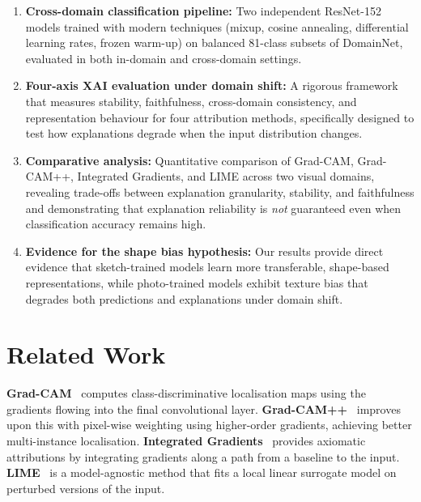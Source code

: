 \documentclass[12pt, a4paper]{article}
\begin{document}
\begin{enumerate}[leftmargin=*]
    \item \textbf{Cross-domain classification pipeline:} Two independent
          ResNet-152 models trained with modern techniques (mixup, cosine
          annealing, differential learning rates, frozen warm-up) on balanced
          81-class subsets of DomainNet, evaluated in both in-domain and
          cross-domain settings.
    \item \textbf{Four-axis XAI evaluation under domain shift:} A rigorous
          framework that measures stability, faithfulness, cross-domain
          consistency, and representation behaviour for four attribution methods,
          specifically designed to test how explanations degrade when the input
          distribution changes.
    \item \textbf{Comparative analysis:} Quantitative comparison of Grad-CAM,
          Grad-CAM++, Integrated Gradients, and LIME across two visual domains,
          revealing trade-offs between explanation granularity, stability, and
          faithfulness  and demonstrating that explanation reliability is
          \emph{not} guaranteed even when classification accuracy remains high.
    \item \textbf{Evidence for the shape bias hypothesis:} Our results provide
          direct evidence that sketch-trained models learn more transferable,
          shape-based representations, while photo-trained models exhibit
          texture bias that degrades both predictions and explanations under
          domain shift.
\end{enumerate}


\section{Related Work}
\label{sec:related}

\textbf{Grad-CAM}~\cite{selvaraju2017gradcam} computes class-discriminative
localisation maps using the gradients flowing into the final convolutional
layer.  \textbf{Grad-CAM++}~\cite{chattopadhay2018gradcampp} improves upon
this with pixel-wise weighting using higher-order gradients, achieving better
multi-instance localisation.  \textbf{Integrated Gradients}~\cite{sundararajan2017ig}
provides axiomatic attributions by integrating gradients along a path from a
baseline to the input.  \textbf{LIME}~\cite{ribeiro2016lime} is a
model-agnostic method that fits a local linear surrogate model on perturbed
versions of the input.
\end{document}
